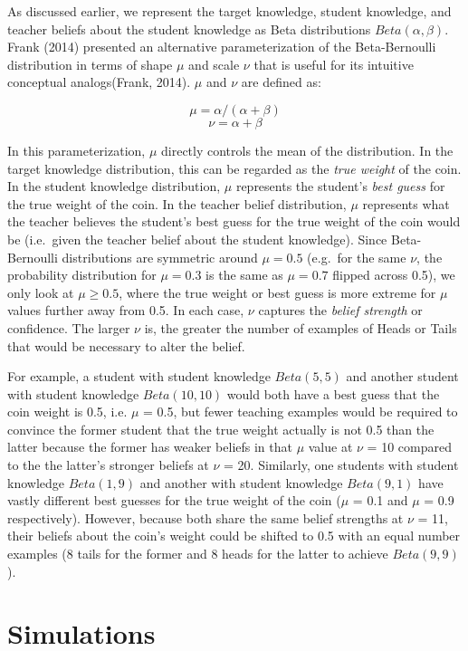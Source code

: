 \documentclass[10pt, letterpaper]{apa6}
\begin{document}
As discussed earlier, we represent the target knowledge, student
knowledge, and teacher beliefs about the student knowledge as Beta
distributions \(Beta(\alpha, \beta)\). Frank (2014) presented an
alternative parameterization of the Beta-Bernoulli distribution in terms
of shape \(\mu\) and scale \(\nu\) that is useful for its intuitive
conceptual analogs(Frank, 2014). \(\mu\) and \(\nu\) are defined as:

\[\mu = \alpha / (\alpha + \beta)\] \[\nu = \alpha + \beta\]

In this parameterization, \(\mu\) directly controls the mean of the
distribution. In the target knowledge distribution, this can be regarded
as the \emph{true weight} of the coin. In the student knowledge
distribution, \(\mu\) represents the student's \emph{best guess} for the
true weight of the coin. In the teacher belief distribution, \(\mu\)
represents what the teacher believes the student's best guess for the
true weight of the coin would be (i.e.~given the teacher belief about
the student knowledge). Since Beta-Bernoulli distributions are symmetric
around \(\mu = 0.5\) (e.g.~for the same \(\nu\), the probability
distribution for \(\mu = 0.3\) is the same as \(\mu = 0.7\) flipped
across 0.5), we only look at \(\mu \geq 0.5\), where the true weight or
best guess is more extreme for \(\mu\) values further away from 0.5. In
each case, \(\nu\) captures the \emph{belief strength} or confidence.
The larger \(\nu\) is, the greater the number of examples of Heads or
Tails that would be necessary to alter the belief.

For example, a student with student knowledge \(Beta(5,5)\) and another
student with student knowledge \(Beta(10,10)\) would both have a best
guess that the coin weight is 0.5, i.e. \(\mu\) = 0.5, but fewer
teaching examples would be required to convince the former student that
the true weight actually is not 0.5 than the latter because the former
has weaker beliefs in that \(\mu\) value at \(\nu\) = 10 compared to the
the latter's stronger beliefs at \(\nu\) = 20. Similarly, one students
with student knowledge \(Beta(1,9)\) and another with student knowledge
\(Beta(9,1)\) have vastly different best guesses for the true weight of
the coin (\(\mu\) = 0.1 and \(\mu\) = 0.9 respectively). However,
because both share the same belief strengths at \(\nu\) = 11, their
beliefs about the coin's weight could be shifted to 0.5 with an equal
number examples (8 tails for the former and 8 heads for the latter to
achieve \(Beta(9,9)\)).

\section{Simulations}\label{simulations}
\end{document}
